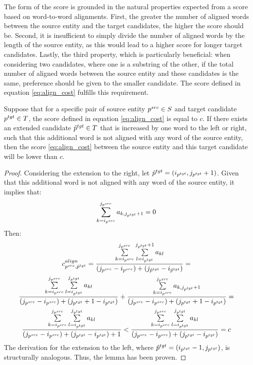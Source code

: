 The form of the score is grounded in the natural properties expected from a score
based on word-to-word alignments. First, the greater the number of aligned words
between the source entity and the target candidates, the higher the score should be.
Second, it is insufficient to simply divide the number of aligned words by the length
of the source entity, as this would lead to a higher score for longer target candidates.
Lastly, the third property, which is particularly beneficial: when considering two candidates,
where one is a substring of the other, if the total number of aligned words between the
source entity and these candidates is the same, preference should be given to the
smaller candidate. The score defined in equation \eqref{eq:align_cost} fulfills this
requirement.
\begin{lemma} \label{lemma:align_cost_decrease}
  Suppose that for a specific pair of source entity \( p^{src} \in S \) and
  target candidate \( p^{tgt} \in T \), the score defined in equation
  \eqref{eq:align_cost} is equal to \( c \). If there exists an extended
  candidate \( \hat{p}^{tgt} \in T \) that is increased by one word to the
  left or right, such that this additional word is not aligned with any word
  of the source entity, then the score \eqref{eq:align_cost} between the source
  entity and this target candidate will be lower than \( c \).
\end{lemma}
\begin{proof}
  Considering the extension to the right, let \( \hat{p}^{tgt} = (i_{p^{tgt}}, j_{p^{tgt}} + 1) \).
  Given that this additional word is not aligned with any word of the source entity,
  it implies that:
  \[
    \sum\limits_{k=i_{p^{src}}}^{j_{p^{src}}} a_{k,j_{p^{tgt}} + 1} = 0
  \]
  Then:
  \begin{multline*}
    c_{p^{src}, \hat{p}^{tgt}}^{align} =
    \frac{\sum\limits_{k=i_{p^{src}}}^{j_{p^{src}}} \sum\limits_{l=i_{p^{tgt}}}^{j_{p^{tgt}} + 1} a_{kl}}
    {(j_{p^{src}} - i_{p^{src}}) + (j_{\hat{p}^{tgt}} - i_{\hat{p}^{tgt}})} =                                \\
    \frac{\sum\limits_{k=i_{p^{src}}}^{j_{p^{src}}} \sum\limits_{l=i_{p^{tgt}}}^{j_{p^{tgt}}} a_{kl}}
    {(j_{p^{src}} - i_{p^{src}}) + (j_{p^{tgt}} + 1 - i_{p^{tgt}})} +
    \frac{\sum\limits_{k=i_{p^{src}}}^{j_{p^{src}}} a_{k,j_{p^{tgt}} + 1}}
    {(j_{p^{src}} - i_{p^{src}}) + (j_{p^{tgt}} + 1 - i_{p^{tgt}})} =                                        \\
    \frac{\sum\limits_{k=i_{p^{src}}}^{j_{p^{src}}} \sum\limits_{l=i_{p^{tgt}}}^{j_{p^{tgt}}} a_{kl}}
    {(j_{p^{src}} - i_{p^{src}}) + (j_{p^{tgt}} - i_{p^{tgt}}) + 1} <
    \frac{\sum\limits_{k=i_{p^{src}}}^{j_{p^{src}}} \sum\limits_{l=i_{p^{tgt}}}^{j_{p^{tgt}}} a_{kl}}
    {(j_{p^{src}} - i_{p^{src}}) + (j_{p^{tgt}} - i_{p^{tgt}})} = c
  \end{multline*}
  The derivation for the extension to the left, where
  \( \hat{p}^{tgt} = (i_{p^{tgt}} - 1, j_{p^{tgt}}) \), is structurally analogous.
  Thus, the lemma has been proven.
\end{proof}

